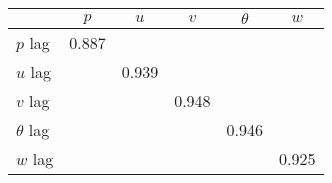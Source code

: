 \begin{tabular}{l*{5}{c}}
\toprule
                &\multicolumn{1}{c}{$ p $}&\multicolumn{1}{c}{$ u $}&\multicolumn{1}{c}{$ v $}&\multicolumn{1}{c}{$ \theta $}&\multicolumn{1}{c}{$ w $}\\
\midrule
$ p $ lag       &    0.887&         &         &         &         \\
$ u $ lag       &         &    0.939&         &         &         \\
$ v $ lag       &         &         &    0.948&         &         \\
$ \theta $ lag  &         &         &         &    0.946&         \\
$ w $ lag       &         &         &         &         &    0.925\\
\bottomrule
\end{tabular}
